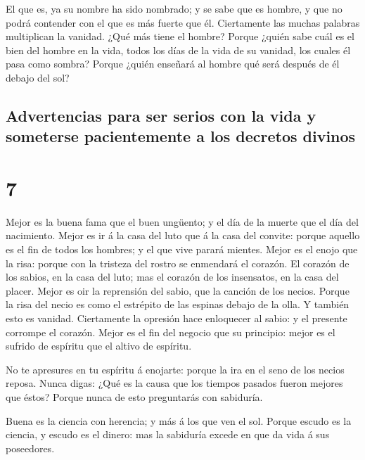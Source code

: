  El que es, ya su nombre ha sido nombrado; y se sabe que
es hombre, y que no podrá contender con el que es más fuerte que él.
 Ciertamente las muchas palabras multiplican la vanidad.
¿Qué más tiene el hombre?  Porque ¿quién sabe cuál es el
bien del hombre en la vida, todos los días de la vida de su vanidad, los
cuales él pasa como sombra? Porque ¿quién enseñará al hombre qué será
después de él debajo del sol?

\hypertarget{advertencias-para-ser-serios-con-la-vida-y-someterse-pacientemente-a-los-decretos-divinos}{%
\subsection{Advertencias para ser serios con la vida y someterse
pacientemente a los decretos
divinos}\label{advertencias-para-ser-serios-con-la-vida-y-someterse-pacientemente-a-los-decretos-divinos}}

\hypertarget{section-21-7}{%
\section{7}\label{section-21-7}}

 Mejor es la buena fama que el buen ungüento; y el día de
la muerte que el día del nacimiento.  Mejor es ir á la
casa del luto que á la casa del convite: porque aquello es el fin de
todos los hombres; y el que vive parará mientes.  Mejor es
el enojo que la risa: porque con la tristeza del rostro se enmendará el
corazón.  El corazón de los sabios, en la casa del luto;
mas el corazón de los insensatos, en la casa del placer. 
Mejor es oir la reprensión del sabio, que la canción de los necios.
 Porque la risa del necio es como el estrépito de las
espinas debajo de la olla. Y también esto es vanidad. 
Ciertamente la opresión hace enloquecer al sabio: y el presente corrompe
el corazón.  Mejor es el fin del negocio que su principio:
mejor es el sufrido de espíritu que el altivo de espíritu.

 No te apresures en tu espíritu á enojarte: porque la ira
en el seno de los necios reposa.  Nunca digas: ¿Qué es la
causa que los tiempos pasados fueron mejores que éstos? Porque nunca de
esto preguntarás con sabiduría.

 Buena es la ciencia con herencia; y más á los que ven el
sol.  Porque escudo es la ciencia, y escudo es el dinero:
mas la sabiduría excede en que da vida á sus poseedores.

